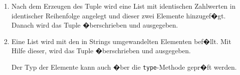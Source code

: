 \begin{enumerate}
\item Nach dem Erzeugen des Tuple wird eine List mit identischen Zahlwerten in identischer Reihenfolge angelegt und dieser zwei Elemente hinzugef�gt. Danach wird das Tuple �berschrieben und ausgegeben. 


\item Eine List wird mit den in Strings umgewandelten Elementen bef�llt. Mit Hilfe dieser, wird das Tuple �berschrieben und ausgegeben.

Der Typ der Elemente kann auch �ber die \lstinline$type$-Methode gepr�ft werden.

\end{enumerate}